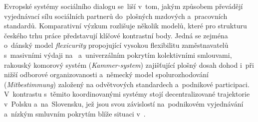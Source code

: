 Evropské systémy sociálního dialogu se~liší v~tom, jakým způsobem převádějí vyjednávací sílu sociálních partnerů do~plošných mzdových a~pracovních standardů. Komparativní výzkum rozlišuje několik modelů, které pro strukturu českého trhu práce představují klíčové kontrastní body. Jedná se zejména o~dánský model \textit{flexicurity} propojující vysokou flexibilitu zaměstnavatelů s~masivními výdaji na~ a~univerzálním pokrytím kolektivními smlouvami, rakouský komorový systém (\textit{Kammer-system}) zajišťující plošný dosah dohod i~při nižší odborové organizovanosti a~německý model spolurozhodování (\textit{Mitbestimmung}) založený na odvětvových standardech a~podnikové participaci. V~kontrastu s~těmito koordinovanými systémy stojí decentralizované trajektorie v~Polsku a~na~Slovensku, jež jsou svou závislostí na~podnikovém vyjednávání a~nízkým smluvním pokrytím blíže situaci v~.~\cite{Hala_SystemySocialnihoDialogu2013}\par
